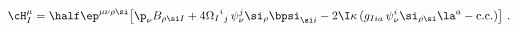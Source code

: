 \begin{equation}
  \cH^\mu_I = \half \ep^{\mu\nu\rho\si} \big[ \p_\nu B_{\rho\si I} +
  4 {\Omega_I}^i{}_j\, \psi_\nu^j \si_\rho \bpsi_{\si i} - 2\I\kappa\,
  (g_{Iia}\, \psi_\nu^i \si_{\rho\si} \la^a - \text{c.c.}) \big]\ .
 \end{equation}

